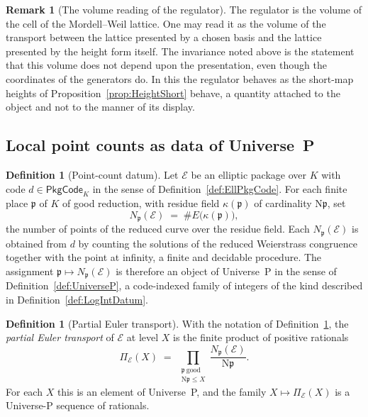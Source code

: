 \documentclass[10pt, reqno]{amsart}
\theoremstyle{plain}
\theoremstyle{definition}
\newtheorem{definition}[theorem]{Definition}
\newtheorem{remark}[theorem]{Remark}
\theoremstyle{plain}
\begin{document}
\begin{remark}[The volume reading of the regulator]\label{rem:RegulatorVolumeReading}
The regulator is the volume of the cell of the Mordell--Weil lattice. One may read it as the volume of the transport between the lattice presented by a chosen basis and the lattice presented by the height form itself. The invariance noted above is the statement that this volume does not depend upon the presentation, even though the coordinates of the generators do. In this the regulator behaves as the short-map heights of Proposition~\ref{prop:HeightShort} behave, a quantity attached to the object and not to the manner of its display.
\end{remark}

\subsection{Local point counts as data of Universe~P}\label{subsec:PointCounts}

\begin{definition}[Point-count datum]\label{def:PointCountDatum}
Let $\mathcal{E}$ be an elliptic package over $K$ with code $d \in \mathsf{PkgCode}_K$ in the sense of Definition~\ref{def:EllPkgCode}. For each finite place $\mathfrak{p}$ of $K$ of good reduction, with residue field $\kappa(\mathfrak{p})$ of cardinality $\mathrm{N}\mathfrak{p}$, set
\[
  N_{\mathfrak{p}}(\mathcal{E}) \;=\; \# E\bigl(\kappa(\mathfrak{p})\bigr),
\]
the number of points of the reduced curve over the residue field. Each $N_{\mathfrak{p}}(\mathcal{E})$ is obtained from $d$ by counting the solutions of the reduced Weierstrass congruence together with the point at infinity, a finite and decidable procedure. The assignment $\mathfrak{p} \mapsto N_{\mathfrak{p}}(\mathcal{E})$ is therefore an object of Universe~P in the sense of Definition~\ref{def:UniverseP}, a code-indexed family of integers of the kind described in Definition~\ref{def:LogIntDatum}.
\end{definition}

\begin{definition}[Partial Euler transport]\label{def:PartialEulerTransport}
With the notation of Definition~\ref{def:PointCountDatum}, the \emph{partial Euler transport} of $\mathcal{E}$ at level $X$ is the finite product of positive rationals
\[
  \Pi_{\mathcal{E}}(X)
  \;=\;
  \prod_{\substack{\mathfrak{p}\ \text{good}\\ \mathrm{N}\mathfrak{p} \le X}}
  \frac{N_{\mathfrak{p}}(\mathcal{E})}{\mathrm{N}\mathfrak{p}}.
\]
For each $X$ this is an element of Universe~P, and the family $X \mapsto \Pi_{\mathcal{E}}(X)$ is a Universe-P sequence of rationals.
\end{definition}
\end{document}
